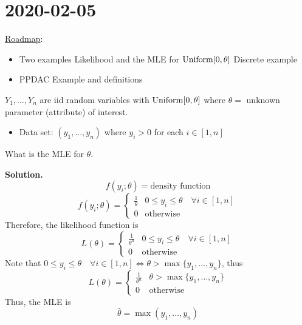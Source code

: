\section{2020-02-05}
\underline{Roadmap}:
\begin{itemize}
    \item Two examples
          \subitem Likelihood and the MLE for $ \operatorname{Uniform}[0,\theta] $
          \subitem Discrete example
    \item PPDAC
          \subitem Example and definitions
\end{itemize}
\begin{exbox}
    \begin{example}\label{uniform mle}
        $ Y_1,\ldots ,Y_n $ are iid random variables with $ \operatorname{Uniform}[0,\theta] $
        where $ \theta= $ unknown parameter (attribute) of interest.
        \begin{itemize}
            \item Data set: $ (y_1,\ldots ,y_n) $ where $ y_i>0 $ for each $ i\in[1,n] $
        \end{itemize}
        What is the MLE for $ \theta $.

        \textbf{Solution.}
        \[ f(y_i;\theta)=\text{density function} \]
        \[ f(y_i;\theta)=
            \begin{cases}
                \frac{1}{\theta} & 0\leqslant y_i \leqslant \theta\quad\forall i\in[1,n] \\
                0                & \text{otherwise}
            \end{cases} \]
        Therefore, the likelihood function is
        \[ L(\theta)=
            \begin{cases}
                \frac{1}{\theta^n} & 0\leqslant y_i\leqslant \theta\quad\forall i\in[1,n] \\
                0                  & \text{otherwise}
            \end{cases} \]
        Note that $ 0\leqslant y_i\leqslant \theta\quad\forall i\in[1,n]\iff
            \theta>\max\{y_1,\ldots ,y_n\} $, thus
        \[ L(\theta)=
            \begin{cases}
                \frac{1}{\theta^n} & \theta>\max \{y_1,\ldots ,y_n\} \\
                0                  & \text{otherwise}
            \end{cases} \]
        Thus, the MLE is
        \[ \hat{\theta}=\max(y_1,\ldots ,y_n) \]
    \end{example}
\end{exbox}

